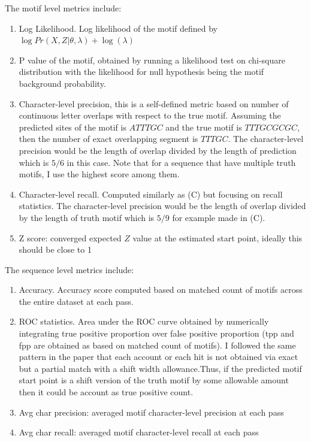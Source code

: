 \documentclass{article}
\begin{document}
The motif level metrics include:

\begin{enumerate}[label=(\Alph*)]
\item Log Likelihood. Log likelihood of the motif defined by $\log{Pr(X,Z|θ,\lambda)}+\log{(\lambda)}$\\
\item P value of the motif, obtained by running a likelihood test on chi-square distribution with the likelihood for null hypothesis being the motif background probability.\\
\item Character-level precision, this is a self-defined metric based on number of continuous letter overlaps with respect to the true motif. Assuming the predicted sites of the motif is $ATTTGC$ and the true motif is $TTTGCGCGC$, then the number of exact overlapping segment is $TTTGC$. The character-level precision would be the length of overlap divided by the length of prediction which is $5/6$ in this case. Note that for a sequence that have multiple truth motifs, I use the highest score among them.\\

\item Character-level recall. Computed similarly as (C) but focusing on recall statistics. The character-level precision would be the length of overlap divided by the length of truth motif which is $5/9$ for example made in (C).\\

\item Z score: converged expected $Z$ value at the estimated start point, ideally this should be close to 1

\end{enumerate}
The sequence level metrics include:
\begin{enumerate}[label=(\Alph*)]
\item Accuracy. Accuracy score computed based on matched count of motifs across the entire dataset at each pass.
\item ROC statistics. Area under the ROC curve obtained by numerically integrating true positive proportion over false positive proportion (tpp and fpp are obtained as based on matched count of motifs). I followed the same pattern in the paper that each account or each hit is not obtained via exact but a partial match with a shift width allowance.Thus, if the predicted motif start point is a shift version of the truth motif by some allowable amount then it could be account as true positive count.  
\item Avg char precision: averaged motif character-level precision at each pass  
\item Avg char recall: averaged motif character-level recall at each pass  
\end{enumerate}
\end{document}
